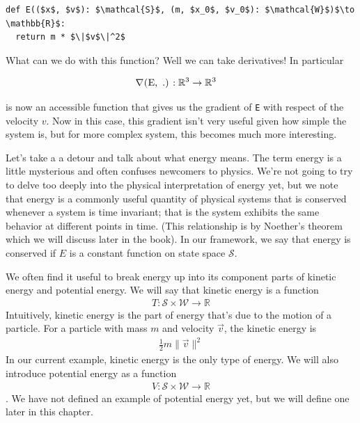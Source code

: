 \documentclass[book.tex]{subfiles}
\begin{document}
\begin{lstlisting}
def E(($x$, $v$): $\mathcal{S}$, (m, $x_0$, $v_0$): $\mathcal{W}$)$\to \mathbb{R}$:
  return m * $\|$v$\|^2$
\end{lstlisting}

What can we do with this function? Well we can take derivatives! In particular

\begin{align}
    \nabla\textrm{\lstinline{(E, .)}} &: \mathbb{R}^3 \to \mathbb{R}^3
\end{align}

\noindent is now an accessible function that gives us the gradient of \lstinline{E} with respect of the velocity $v$. Now in this case, this gradient isn't very useful given how simple the system is, but for more complex system, this becomes much more interesting. 

Let's take a a detour and talk about what energy means. The term energy is a little mysterious and often confuses newcomers to physics. We're not going to try to delve too deeply into the physical interpretation of energy yet, but we note that energy is a commonly useful quantity of physical systems that is conserved whenever a system is time invariant; that is the system exhibits the same behavior at different points in time. (This relationship is by Noether's theorem which we will discuss later in the book). In our framework, we say that energy is conserved if $E$ is a constant function on state space $\mathcal{S}$. 

We often find it useful to break energy up into its component parts of kinetic energy and potential energy. We will say that kinetic energy is a function 
\begin{align}
T: \mathcal{S} \times \mathcal{W} \to \mathbb{R}
\end{align}
Intuitively, kinetic energy is the part of energy that's due to the motion of a particle. For a particle with mass $m$ and velocity $\vec{v}$, the kinetic energy is \begin{align}
\tfrac{1}{2}m\|\vec{v}\|^2
\end{align}
In our current example, kinetic energy is the only type of energy. We will also introduce potential energy as a function 
\begin{align}
V: \mathcal{S} \times \mathcal{W} \to \mathbb{R}
\end{align}. 
We have not defined an example of potential energy yet, but we will define one later in this chapter.
\end{document}
